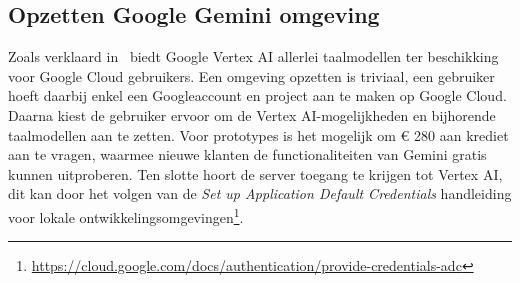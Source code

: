 \subsection{Opzetten Google Gemini omgeving}
\label{subsec:opzetten-google-gemini-omgeving}
Zoals verklaard in~ biedt Google Vertex AI allerlei taalmodellen ter beschikking voor Google Cloud gebruikers.
Een omgeving opzetten is triviaal, een gebruiker hoeft daarbij enkel een Googleaccount en project aan te maken op Google Cloud.
Daarna kiest de gebruiker ervoor om de Vertex AI-mogelijkheden en bijhorende taalmodellen aan te zetten.
Voor prototypes is het mogelijk om € 280 aan krediet aan te vragen, waarmee nieuwe klanten de functionaliteiten van Gemini gratis kunnen uitproberen.
Ten slotte hoort de server toegang te krijgen tot Vertex AI, dit kan door het volgen van de \textit{Set up Application Default Credentials} handleiding voor lokale ontwikkelingsomgevingen\footnote{\url{https://cloud.google.com/docs/authentication/provide-credentials-adc}}.

